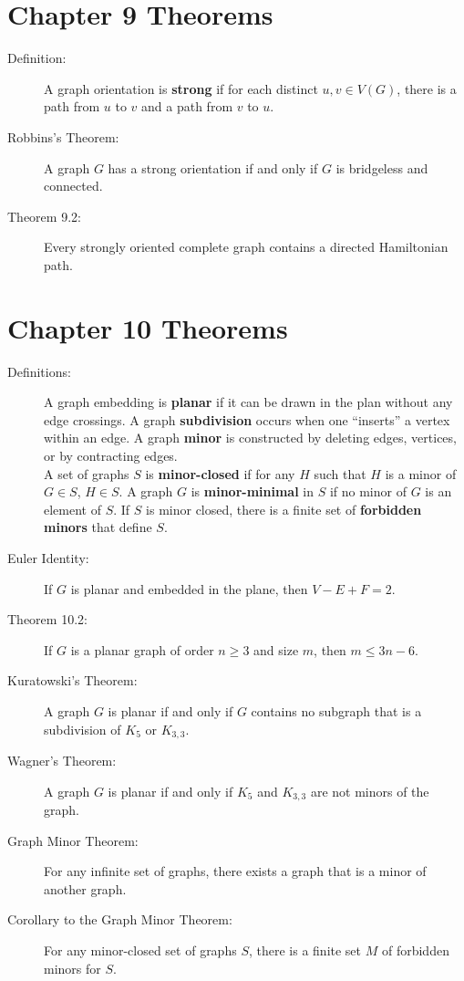 \documentclass[9pt]{extarticle}
\begin{document}
  \section*{Chapter 9 Theorems}%
  \begin{description}
    \item[Definition:] A graph orientation is \textbf{strong} if for each distinct $u,v\in V(G)$, there is a path from $u$ to $v$ and a path from $v$ to $u$.
    \item[Robbins's Theorem:] A graph $G$ has a strong orientation if and only if $G$ is bridgeless and connected.
    \item[Theorem 9.2:] Every strongly oriented complete graph contains a directed Hamiltonian path.
  \end{description}
  \section*{Chapter 10 Theorems}%
  \begin{description}
    \item[Definitions:] A graph embedding is \textbf{planar} if it can be drawn in the plan without any edge crossings. A graph \textbf{subdivision} occurs when one ``inserts'' a vertex within an edge. A graph \textbf{minor} is constructed by deleting edges, vertices, or by contracting edges.\\

    A set of graphs $S$ is \textbf{minor-closed} if for any $H$ such that $H$ is a minor of $G\in S$, $H\in S$. A graph $G$ is \textbf{minor-minimal} in $S$ if no minor of $G$ is an element of $S$. If $S$ is minor closed, there is a finite set of \textbf{forbidden minors} that define $S$.
    \item[Euler Identity:] If $G$ is planar and embedded in the plane, then $V-E+F = 2$.
    \item[Theorem 10.2:] If $G$ is a planar graph of order $n\geq 3$ and size $m$, then $m \leq 3n - 6$.
    \item[Kuratowski's Theorem:] A graph $G$ is planar if and only if $G$ contains no subgraph that is a subdivision of $K_{5}$ or $K_{3,3}$.
    \item[Wagner's Theorem:] A graph $G$ is planar if and only if $K_{5}$ and $K_{3,3}$ are not minors of the graph.
    \item[Graph Minor Theorem:] For any infinite set of graphs, there exists a graph that is a minor of another graph.
    \item[Corollary to the Graph Minor Theorem:] For any minor-closed set of graphs $S$, there is a finite set $M$ of forbidden minors for $S$.
  \end{description}
\end{document}
